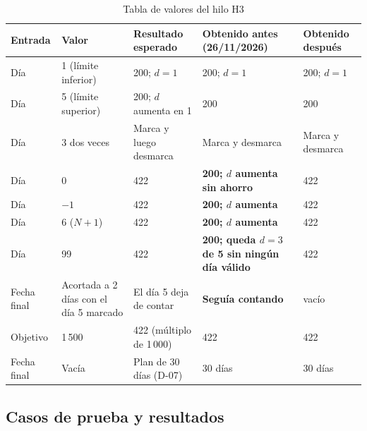 \begin{table}[H]
\caption{Tabla de valores del hilo H3}
\label{tab:valores-h3}
\footnotesize
\begin{tabularx}{\linewidth}{L{2.2cm} L{1.6cm} L{3.4cm} L{3cm} Y}
\toprule
Entrada & Valor & Resultado esperado & Obtenido antes (26/11/2026) & Obtenido después \\
\midrule
Día & 1 (límite inferior) & 200; $d = 1$ & 200; $d = 1$ & 200; $d = 1$ \\
Día & 5 (límite superior) & 200; $d$ aumenta en 1 & 200 & 200 \\
Día & 3 dos veces & Marca y luego desmarca & Marca y desmarca & Marca y desmarca \\
Día & 0 & 422 & \textbf{200; $d$ aumenta sin ahorro} & 422 \\
Día & $-1$ & 422 & \textbf{200; $d$ aumenta} & 422 \\
Día & 6 ($N + 1$) & 422 & \textbf{200; $d$ aumenta} & 422 \\
Día & 99 & 422 & \textbf{200; queda $d = 3$ de 5 sin ningún día válido} & 422 \\
Fecha final & Acortada a 2 días con el día 5 marcado & El día 5 deja de contar & \textbf{Seguía contando} &  vacío \\
Objetivo & 1\,500 & 422 (múltiplo de 1\,000) & 422 & 422 \\
Fecha final & Vacía & Plan de 30 días (D-07) & 30 días & 30 días \\
\bottomrule
\end{tabularx}
\end{table}

\subsection{Casos de prueba y resultados}

